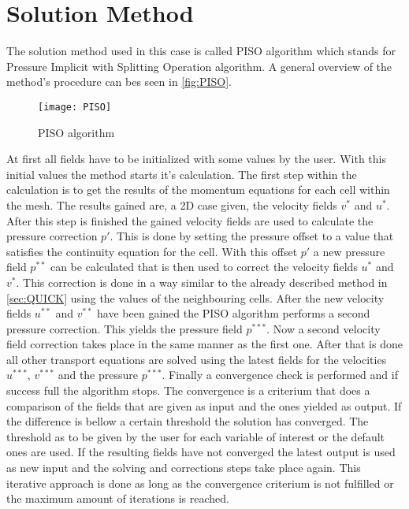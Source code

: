 \documentclass[../thesis.tex]{subfiles}
\begin{document}
\section{Solution Method}
\label{sec:sol_method}

The solution method used in this case is called PISO algorithm which stands for Pressure Implicit with Splitting Operation algorithm. A general overview of the method's procedure can bes seen in \autoref{fig:PISO}.

\begin{figure}[htbp]
	\centering
	\texttt{[image: PISO]}
	\caption{PISO algorithm}
	\label{fig:PISO}
\end{figure}

At first all fields have to be initialized with some values by the user. With this initial values the method starts it's calculation. The first step within the calculation is to get the results of the momentum equations for each cell within the mesh. The results gained are, a 2D case given, the velocity fields $v^*$ and $u^*$. After this step is finished the gained velocity fields are used to calculate the pressure correction $p'$. This is done by setting the pressure offset to a value that satisfies the continuity equation for the cell. With this offset $p'$ a new pressure field $p^{**}$ can be calculated that is then used to correct the velocity fields $u^*$ and $v^*$. This correction is done in a way similar to the already described method in \autoref{sec:QUICK} using the values of the neighbouring cells. After the new velocity fields $u^{**}$ and $v^{**}$ have been gained the PISO algorithm performs a second pressure correction. This yields the pressure field $p^{***}$. Now a second velocity field correction takes place in the same manner as the first one. After that is done all other transport equations are solved using the latest fields for the velocities $u^{***}$, $v^{***}$ and the pressure $p^{***}$. Finally a convergence check is performed and if success full the algorithm stops. The convergence is a criterium that does a comparison of the fields that are given as input and the ones yielded as output. If the difference is bellow a certain threshold the solution has converged. The threshold as to be given by the user for each variable of interest or the default ones are used. If the resulting fields have not converged the latest output is used as new input and the solving and corrections steps take place again. This iterative approach is done as long as the convergence criterium is not fulfilled or the maximum amount of iterations is reached.
\end{document}
